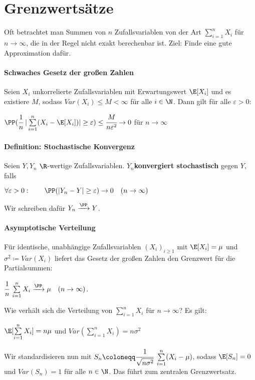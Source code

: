 \section{Grenzwertsätze}
Oft betrachtet man Summen von $n$ Zufallsvariablen von der Art $\sum\limits_{i=1}^{n}X_i$ für $n\rightarrow\infty$, die in der Regel nicht exakt berechenbar ist.
Ziel: Finde eine gute Approximation dafür.

\paragraph{Schwaches Gesetz der großen Zahlen}
Seien $X_i$ unkorrelierte Zufallsvariablen mit Erwartungswert $\E[X_i]$ und es existiere $M$, sodass $Var(X_i)\leq M<\infty$ für alle $i\in\N$.
Dann gilt für alle $\varepsilon>0$:
\begin{tightcenter}
	$\PP(\cfrac{1}{n}\;|\sum\limits_{i=1}^{n}(X_i-\E[X_i])|\geq\varepsilon)\leq\cfrac{M}{n\varepsilon^2}\rightarrow0$ \qquad für $n\rightarrow\infty$
\end{tightcenter}

\paragraph{Definition: Stochastische Konvergenz}
Seien $Y,Y_n$ $\R$-wertige Zufallsvariablen.
$Y_n$\textbf{konvergiert stochastisch} gegen $Y$, falls
\begin{tightcenter} 
	$\forall\varepsilon>0:\qquad\PP(|Y_n-Y|\geq\varepsilon)\rightarrow0\quad(n\rightarrow\infty)$
\end{tightcenter}
Wir schreiben dafür $Y_n\xrightarrow{\PP}Y$.

\paragraph{Asymptotische Verteilung}
Für identische, unabhängige Zufallsvariablen $(X_i)_{i\geq1}$ mit $\E[X_i]=\mu$ und $\sigma^2\coloneqq Var(X_i)$ liefert das Gesetz der großen Zahlen den Grenzwert für die Partialsummen:
\begin{tightcenter}
	 $\cfrac{1}{n}\;\sum\limits_{i=1}^{n}X_i\xrightarrow{\PP}\mu\quad (n\rightarrow\infty)$.
\end{tightcenter}
Wie verhält sich die Verteilung von $\sum\limits_{i=1}^{n}X_i$ für $n\rightarrow\infty$? Es gilt:
\begin{tightcenter}
	$\E[\sum\limits_{i=1}^{n}X_i]=n\mu$ und $Var(\sum\limits_{i=1}^{n}X_i)=n\sigma^2$
\end{tightcenter}
Wir standardisieren nun mit $S_n\coloneqq\cfrac{1}{\sqrt{n\sigma^2}}\;\sum\limits_{i=1}^{n}(X_i-\mu)$, sodass $\E[S_n]=0$ und $Var(S_n)=1$ für alle $n\in\N$. 
Das führt zum zentralen Grenzwertsatz.

